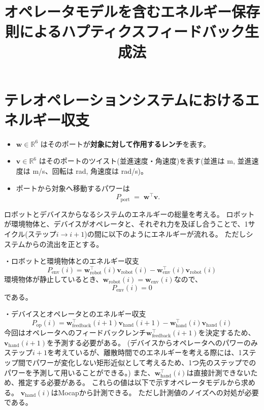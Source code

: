 \documentclass[uplatex]{jsarticle}
\title{オペレータモデルを含むエネルギー保存則によるハプティクスフィードバック生成法}
\author{}
\date{}
\begin{document}
\maketitle



\section{テレオペレーションシステムにおけるエネルギー収支}

\begin{itemize}
  \item $\bm{w}\in\mathbb{R}^6$ はそのポートが\textbf{対象に対して作用するレンチ}を表す。
  \item $\bm{v}\in\mathbb{R}^6$ はそのポートのツイスト(並進速度・角速度)を表す(並進は \si{m}, 並進速度は \si{m/s}、回転は \si{rad}, 角速度は \si{rad/s})。
  \item ポートから対象へ移動するパワーは
  \[
    P_{\text{port}} \;=\; \bm{w}^\top \bm{v}.
  \]
\end{itemize}

ロボットとデバイスからなるシステムのエネルギーの総量を考える。
ロボットが環境物体と、デバイスがオペレータと、それぞれ力を及ぼし合うことで、1サイクル(ステップ$i\to i+1$)の間に以下のようにエネルギーが流れる。
ただしシステムからの流出を正とする。

・ロボットと環境物体とのエネルギー収支
\begin{equation}
  P_{\text{env}}(i) = \bm{w}_{\text{robot}}^\top(i) \bm{v}_{\text{robot}}(i) - \bm{w}_{\text{env}}^\top(i) \bm{v}_{\text{robot}}(i)
\end{equation}
環境物体が静止しているとき、$\bm{w}_{\text{robot}}(i) = \bm{w}_{\text{env}}(i)$なので、
\begin{equation}
  P_{\text{env}}(i) = 0
\end{equation}
である。

・デバイスとオペレータとのエネルギー収支
\begin{equation}
  P_{\text{op}}(i) = \bm{w}_{\text{feedback}}^\top(i+1) \bm{v}_{\text{hand}}(i+1) - \bm{w}_{\text{hand}}^\top(i) \bm{v}_{\text{hand}}(i)
\end{equation}
今回はオペレータへのフィードバックレンチ$\bm{w}_{\text{feedback}}^\top(i+1)$を決定するため、$\bm{v}_{\text{hand}}(i+1)$を予測する必要がある。
(デバイスからオペレータへのパワーのみステップ$i+1$を考えているが、離散時間でのエネルギーを考える際には、1ステップ間でパワーが変化しない矩形近似として考えるため、1つ先のステップでのパワーを予測して用いることができる。)
また、$\bm{w}_{\text{hand}}^\top(i)$は直接計測できないため、推定する必要がある。
これらの値は以下で示すオペレータモデルから求める。
$\bm{v}_{\text{hand}}(i)$はMocapから計測できる。
ただし計測値のノイズへの対処が必要である。
\end{document}
